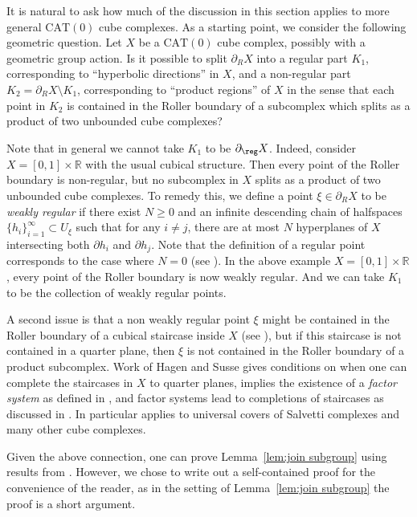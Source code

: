 \begin{rk}
It is natural to ask how much of the discussion in this section applies to more general $\mathrm{CAT}(0)$ cube complexes. As a starting point, we consider the following geometric question.
Let $X$ be a $\mathrm{CAT}(0)$ cube complex, possibly with a geometric group action. Is it possible to split $\partial_R X$ into a regular part $K_1$, corresponding to ``hyperbolic directions'' in $X$, and a non-regular part $K_2=\partial_{R} X\setminus K_1$, corresponding to ``product regions'' of $X$ in the sense that each point in $K_2$ is contained in the Roller boundary of a subcomplex which splits as a product of two unbounded cube complexes?

Note that in general we cannot take $K_1$ to be $\partial_{\reg} X$. Indeed, consider $X=[0,1]\times \mathbb R$ with the usual cubical structure. Then every point of the Roller boundary is non-regular, but no subcomplex in $X$ splits as a product of two unbounded cube complexes. To remedy this, we define a point $\xi\in\partial_R X$ to be \emph{weakly regular} if there exist $N\ge 0$ and an infinite descending chain of halfspaces $\{h_i\}_{i=1}^\infty\subset U_\xi$ such that for any $i\neq j$, there are at most $N$ hyperplanes of $X$ intersecting both $\partial h_i$ and $\partial h_j$. Note that the definition of a regular point corresponds to the case where $N=0$ (see \cite[Prop.\,7.5]{Fer}).
In the above example $X=[0,1]\times\mathbb{R}$, every point of the Roller boundary is now weakly regular. And we can take $K_1$ to be the collection of weakly regular points.

A second issue is that a non weakly regular point $\xi$ might be contained in the Roller boundary of a cubical staircase inside $X$ (see \eg \cite[Fig.\,1]{hagen2020hierarchical}), but if this
staircase is not contained in a quarter plane, then $\xi$ is not contained in the Roller boundary of a product subcomplex. Work of Hagen and Susse \cite{hagen2020hierarchical} gives conditions on when one can complete the staircases in $X$ to quarter planes, \ie \cite[Th.\,A]{hagen2020hierarchical} implies the existence of a \emph{factor system} as defined in \cite[\S 1.2]{hagen2020hierarchical}, and factor systems lead to completions of staircases as discussed in \cite[\S 7]{hagen2020hierarchical}. In particular \cite[Th.\,A]{hagen2020hierarchical} applies to universal covers of Salvetti complexes and many other cube complexes.

Given the above connection, one can prove Lemma~\ref{lem:join subgroup} using results from \cite{hagen2020hierarchical}. However, we chose to write out a self-contained proof for the convenience of the reader, as in the setting of Lemma~\ref{lem:join subgroup} the proof is a short argument.
\end{rk}

